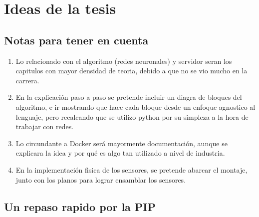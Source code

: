 \chapter{Ideas de la tesis}

\section{Notas para tener en cuenta}

\begin{enumerate}
    \item Lo relacionado con el algoritmo (redes neuronales) y servidor seran los capitulos con mayor densidad de teoria, debido a que no se vio mucho en la carrera.
    \item En la explicación paso a paso se pretende incluir un diagra de bloques del algoritmo, e ir mostrando que hace cada bloque desde un enfoque agnostico al lenguaje, pero recalcando que se utilizo python por su simpleza a la hora de trabajar con redes.
    \item Lo circundante a Docker será mayormente documentación, aunque se explicara la idea y por qué es algo tan utilizado a nivel de industria.
    \item En la implementación fisica de los sensores, se pretende abarcar el montaje, junto con los planos para lograr ensamblar los sensores.
\end{enumerate}

\section{Un repaso rapido por la PIP}












